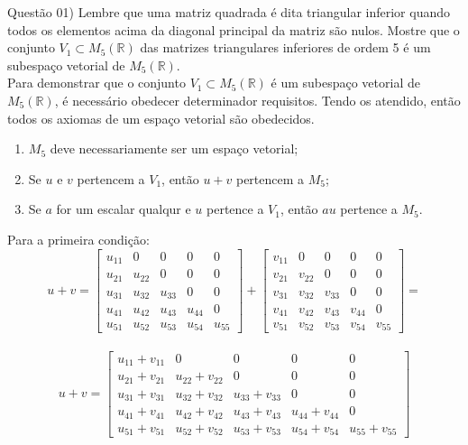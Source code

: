 
\noindent \textcolor{COLOR1}{Questão 01)} Lembre que uma matriz quadrada é dita triangular inferior quando todos os elementos acima da diagonal principal da matriz são nulos. Mostre que o conjunto $V_1\subset M_5 (\mathbb{R})$ das matrizes triangulares inferiores de ordem 5 é um subespaço vetorial de $M_5 (\mathbb{R})$.
\\

Para demonstrar que o conjunto $V_1\subset M_5 (\mathbb{R})$ é um subespaço vetorial de $M_5 (\mathbb{R})$, é necessário obedecer determinador requisitos. Tendo os atendido, então todos os axiomas de um espaço vetorial são obedecidos.

\begin{enumerate}
    \item $M_5$ deve necessariamente ser um espaço vetorial;
    \item Se $u$ e $v$ pertencem a $V_1$, então $u + v$ pertencem a $M_5$;
    \item Se $a$ for um escalar qualqur e $u$ pertence a $V_1$, então $au$ pertence a $M_5$.
\end{enumerate}

Para a primeira condição:\\
\[
    u + v =
    \begin{bmatrix}
        u_{11} & 0      & 0      & 0      & 0      \\
        u_{21} & u_{22} & 0      & 0      & 0      \\
        u_{31} & u_{32} & u_{33} & 0      & 0      \\
        u_{41} & u_{42} & u_{43} & u_{44} & 0      \\
        u_{51} & u_{52} & u_{53} & u_{54} & u_{55}
    \end{bmatrix} +
    \begin{bmatrix}
        v_{11} & 0      & 0      & 0      & 0      \\
        v_{21} & v_{22} & 0      & 0      & 0      \\
        v_{31} & v_{32} & v_{33} & 0      & 0      \\
        v_{41} & v_{42} & v_{43} & v_{44} & 0      \\
        v_{51} & v_{52} & v_{53} & v_{54} & v_{55}
    \end{bmatrix}=
\]
\\
\[
    u + v =
    \begin{bmatrix}
        u_{11}+v_{11} & 0             & 0             & 0             & 0             \\
        u_{21}+v_{21} & u_{22}+v_{22} & 0             & 0             & 0             \\
        u_{31}+v_{31} & u_{32}+v_{32} & u_{33}+v_{33} & 0             & 0             \\
        u_{41}+v_{41} & u_{42}+v_{42} & u_{43}+v_{43} & u_{44}+v_{44} & 0             \\
        u_{51}+v_{51} & u_{52}+v_{52} & u_{53}+v_{53} & u_{54}+v_{54} & u_{55}+v_{55}
    \end{bmatrix}
\]
\\


